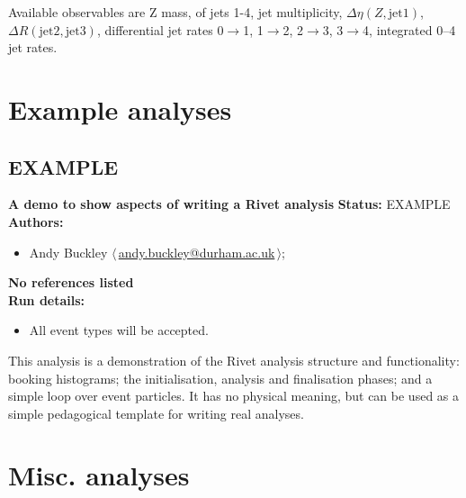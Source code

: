 \noindent Available observables are Z mass, \pT of jets 1-4, jet multiplicity, $\Delta\eta(Z, \text{jet1})$, $\Delta R(\text{jet2}, \text{jet3})$,  differential jet rates 0\ensuremath{\to}1, 1\ensuremath{\to}2, 2\ensuremath{\to}3, 3\ensuremath{\to}4, integrated 0--4 jet  rates.

\clearpage


\section{Example analyses}
\subsection{EXAMPLE}
\textbf{A demo to show aspects of writing a Rivet analysis}\newline
\textbf{Status:} EXAMPLE\newline
\textbf{Authors:}
\begin{itemize}
  \item Andy Buckley $\langle\,$\href{mailto:andy.buckley@durham.ac.uk}{andy.buckley@durham.ac.uk}$\,\rangle$;
\end{itemize}
\textbf{No references listed}\\ 
\textbf{Run details:}
\begin{itemize}

  \item All event types will be accepted.\end{itemize}

\noindent This analysis is a demonstration of the Rivet analysis structure and functionality: booking histograms; the initialisation, analysis and finalisation phases; and a simple loop over event particles. It has no physical meaning, but can be used as a simple pedagogical template for writing real analyses.

\clearpage


\section{Misc. analyses}

